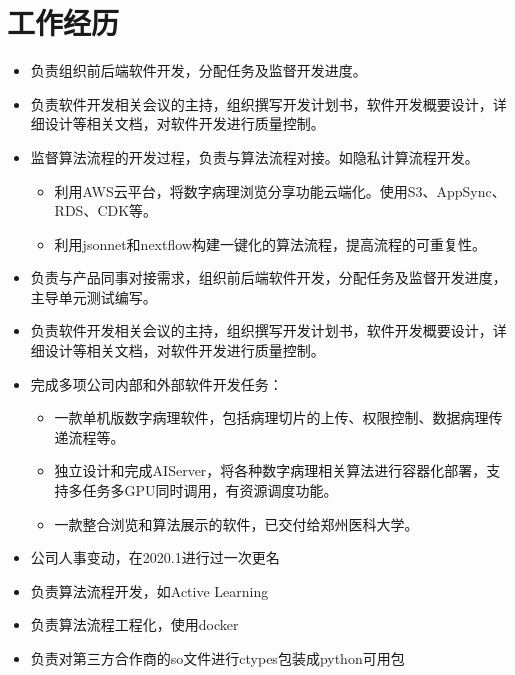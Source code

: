 \documentclass{resume}
\begin{document}

\section{工作经历}
\begin{itemize}
  \item 负责组织前后端软件开发，分配任务及监督开发进度。
  \item 负责软件开发相关会议的主持，组织撰写开发计划书，软件开发概要设计，详细设计等相关文档，对软件开发进行质量控制。
  \item 监督算法流程的开发过程，负责与算法流程对接。如隐私计算流程开发。
    \begin{itemize}
    \item 利用AWS云平台，将数字病理浏览分享功能云端化。使用S3、AppSync、RDS、CDK等。
    \item 利用jsonnet和nextflow构建一键化的算法流程，提高流程的可重复性。
    \end{itemize}
\end{itemize}

\begin{itemize}
  \item 负责与产品同事对接需求，组织前后端软件开发，分配任务及监督开发进度，主导单元测试编写。
  \item 负责软件开发相关会议的主持，组织撰写开发计划书，软件开发概要设计，详细设计等相关文档，对软件开发进行质量控制。
  \item 完成多项公司内部和外部软件开发任务：
    \begin{itemize}
    \item 一款单机版数字病理软件，包括病理切片的上传、权限控制、数据病理传递流程等。
    \item 独立设计和完成AIServer，将各种数字病理相关算法进行容器化部署，支持多任务多GPU同时调用，有资源调度功能。
    \item 一款整合浏览和算法展示的软件，已交付给郑州医科大学。
    \end{itemize}
\end{itemize}

\begin{itemize}
  \item 公司人事变动，在2020.1进行过一次更名
  \item 负责算法流程开发，如Active Learning
  \item 负责算法流程工程化，使用docker
  \item 负责对第三方合作商的so文件进行ctypes包装成python可用包
\end{itemize}
\end{document}
